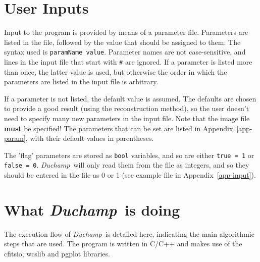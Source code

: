 \documentclass[12pt,a4paper]{article}
\newcommand{\duchamp}{\emph{Duchamp}}
\begin{document}
\section{User Inputs}
\label{sec-param}

Input to the program is provided by means of a parameter
file. Parameters are listed in the file, followed by the value that
should be assigned to them. The syntax used is \texttt{paramName
value}. Parameter names are not case-sensitive, and lines in the input
file that start with \texttt{\#} are ignored. If a parameter is listed
more than once, the latter value is used, but otherwise the order in
which the parameters are listed in the input file is arbitrary.

If a parameter is not listed, the default value is assumed. The
defaults are chosen to provide a good result (using the reconstruction
method), so the user doesn't need to specify many new parameters in
the input file. Note that the image file \textbf{must} be specified! The
parameters that can be set are listed in Appendix~\ref{app-param},
with their default values in parentheses.

The 'flag' parameters are stored as \texttt{bool} variables, and so are
either \texttt{true = 1} or \texttt{false = 0}. \duchamp\ will only
read them from the file as integers, and so they should be entered in
the file as 0 or 1 (see example file in Appendix~\ref{app-input}).

\section{What \duchamp\ is doing}
\label{sec-flow}

The execution flow of \duchamp\ is detailed here, indicating the
main algorithmic steps that are used. The program is written in C/C++
and makes use of the {\sc cfitsio}, {\sc wcslib} and {\sc pgplot}
libraries. 

%
\end{document}
